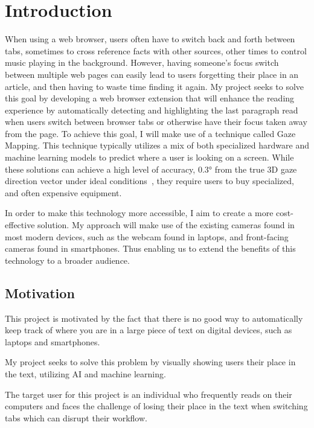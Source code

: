 \documentclass[twocolumn]{report}
\begin{document}
\tableofcontents

\chapter{Introduction}

\noindent
When using a web browser, users often have to switch back and forth between tabs, sometimes to cross reference facts with other sources, other times to control music playing in the background. However, having someone's focus switch between multiple web pages can easily lead to users forgetting their place in an article, and then having to waste time finding it again. My project seeks to solve this goal by developing a web browser extension that will enhance the reading experience by automatically detecting and highlighting the last paragraph read when users switch between browser tabs or otherwise have their focus taken away from the page. To achieve this goal, I will make use of a technique called Gaze Mapping. This technique typically utilizes a mix of both specialized hardware and machine learning models to predict where a user is looking on a screen. While these solutions can achieve a high level of accuracy, \(\ang{0.3}\) from the true 3D gaze direction vector under ideal conditions~\cite{tobiiprofusion}, they require users to buy specialized, and often expensive equipment.

In order to make this technology more accessible, I aim to create a more cost-effective solution. My approach will make use of the existing cameras found in most modern devices, such as the webcam found in laptops, and front-facing cameras found in smartphones. Thus enabling us to extend the benefits of this technology to a broader audience.


\section{Motivation}

This project is motivated by the fact that there is no good way to automatically keep track of where you are in a large piece of text on digital devices, such as laptops and smartphones.

My project seeks to solve this problem by visually showing users their place in the text, utilizing AI and machine learning.

The target user for this project is an individual who frequently reads on their computers and faces the challenge of losing their place in the text when switching tabs which can disrupt their workflow.
\end{document}
